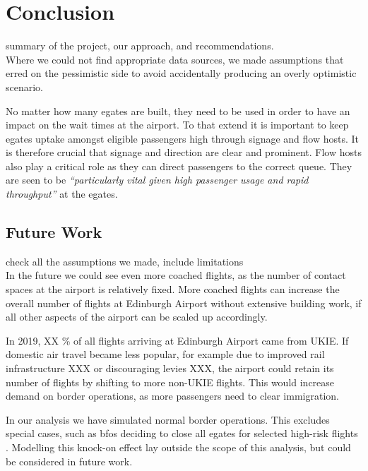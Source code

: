 \documentclass[10pt]{article}
\begin{document}
\section{Conclusion}
summary of the project, our approach, and recommendations. \\

Where we could not find appropriate data sources, we made assumptions that erred on the pessimistic side to avoid accidentally producing an overly optimistic scenario.

No matter how many \glspl{egate} are built, they need to be used in order to have an impact on the wait times at the airport. To that extend it is important to keep \glspl{egate} uptake amongst eligible passengers high through signage and flow hosts. It is therefore crucial that signage and direction are clear and prominent. Flow hosts also play a critical role as they can direct passengers to the correct queue. They are seen to be \textit{``particularly vital given high passenger usage and rapid throughput''} \cite[][paragraph 6.28]{Inspection_eGates} at the \glspl{egate}.



\subsection{Future Work}
check all the assumptions we made, include limitations \\

In the future we could see even more coached flights, as the number of contact spaces at the airport is relatively fixed. More coached flights can increase the overall number of flights at Edinburgh Airport without extensive building work, if all other aspects of the airport can be scaled up accordingly.

In 2019, XX \% of all flights arriving at Edinburgh Airport came from UKIE. If domestic air travel became less popular, for example due to improved rail infrastructure XXX or discouraging levies XXX, the airport could retain its number of flights by shifting to more non-UKIE flights. This would increase demand on border operations, as more passengers need to clear immigration. 

In our analysis we have simulated normal border operations. This excludes special cases, such as \glspl{bfo} deciding to close all \glspl{egate} for selected high-risk flights \cite{Inspection_eGates}. Modelling this knock-on effect lay outside the scope of this analysis, but could be considered in future work.


{\footnotesize
}
% 
\end{document}
